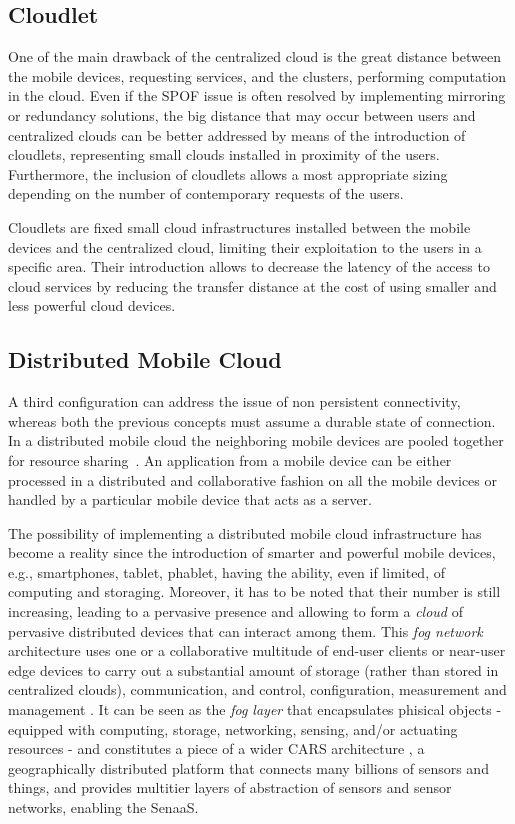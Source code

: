 \documentclass[twoside,openright]{report}
\begin{document}
\subsection*{Cloudlet}
One of the main drawback of the centralized cloud is the great distance between the mobile devices, requesting services, and the clusters, performing computation in the cloud. 
Even if the  \gls{SPOF} issue is often resolved by implementing mirroring or redundancy solutions, the big distance that may occur between users and centralized clouds can be better addressed by means of the introduction of cloudlets, representing small clouds installed in proximity of the users. 
Furthermore, the inclusion of cloudlets allows a most appropriate sizing depending on the number of contemporary requests of the users. 

Cloudlets are fixed small cloud infrastructures installed between the mobile devices and the centralized cloud, limiting their exploitation to the users in a specific area. 
Their introduction allows to decrease the latency of the access to cloud services by reducing the transfer distance at the cost of using smaller and less powerful cloud devices.

\subsection*{Distributed Mobile Cloud}
A third configuration can address the issue of non persistent connectivity, whereas both the previous concepts must assume a durable state of connection.  
In a distributed mobile cloud the neighboring mobile devices are pooled together for resource sharing~\cite{Fangming}.
An application from a mobile device can be either processed in a distributed and collaborative fashion on all the mobile devices or handled by a particular mobile device that acts as a server.

The possibility of implementing a distributed mobile cloud infrastructure has become a reality since the introduction of smarter and powerful mobile devices, e.g., smartphones, tablet, phablet, having the ability, even if limited, of computing and storaging. 
Moreover, it has to be noted that their number is still increasing, leading to a pervasive presence and allowing to form a \emph{cloud} of pervasive distributed devices that can interact among them.
This \emph{fog network} architecture uses one or a collaborative multitude of end-user clients or near-user edge devices to carry out a substantial amount of storage (rather than stored in centralized clouds), communication, and control, configuration, measurement and management \cite{Bonomi2012, Bonomi2014}.
It can be seen as the \emph{fog layer} that encapsulates phisical objects - equipped with computing, storage, networking, sensing, and/or actuating resources - and constitutes a piece of a wider \gls{CARS} architecture \cite{Guizani2014}, a geographically distributed platform that connects many billions of sensors and things, and provides multitier layers of abstraction of sensors and sensor networks, enabling the \gls{SenaaS}. 
\end{document}
